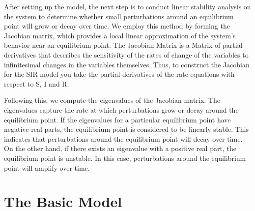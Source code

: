 \documentclass{article}
\begin{document}
After setting up the model, the next step is to conduct linear stability analysis on the system to determine whether small perturbations around an equilibrium point will grow or decay over time. We employ this method by forming the Jacobian matrix, which provides a local linear approximation of the system’s behavior near an equilibrium point. The Jacobian Matrix is a Matrix of partial derivatives that describes the sensitivity of the rates of change of the variables to infinitesimal changes in the variables themselves. Thus, to construct the Jacobian for the SIR model you take the partial derivatives of the rate equations with respect to S, I and R.

Following this, we compute the eigenvalues of the Jacobian matrix. The eigenvalues capture the rate at which perturbations grow or decay around the equilibrium point. If the eigenvalues for a particular equilibrium point have negative real parts, the equilibrium point is considered to be linearly stable. This indicates that perturbations around the equilibrium point will decay over time. On the other hand, if there exists an eigenvalue with a positive real part, the equilibrium point is unstable. In this case, perturbations around the equilibrium point will amplify over time.

\section{The Basic Model}
\end{document}
